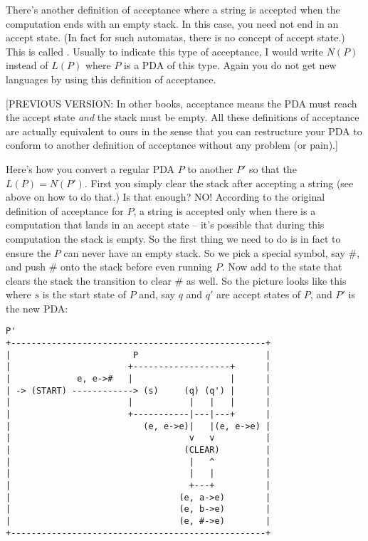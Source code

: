 There's another definition of acceptance where a string is accepted when the 
computation ends with an empty stack. 
In this case, you need not end in an accept state.
(In fact for such automatas, there is no concept of accept state.)
This is called .
Usually to indicate this type of acceptance, I would write $N(P)$
instead of $L(P)$ where $P$ is a PDA of this type.
Again you do not get new languages by using this definition of acceptance.


[PREVIOUS
VERSION: 
In other books, acceptance means the PDA must reach the accept state
\textit{ and} the stack must be empty.
All these definitions of acceptance are actually equivalent to ours
in the sense that you can restructure your PDA to conform to another definition
of acceptance without any problem (or pain).]


Here's how you convert a regular PDA $P$ to another $P'$ so that the 
$L(P) = N(P')$.
First you simply clear the stack after accepting a string (see above on how to
do that.)
Is that enough?
NO! According to the original definition of acceptance for $P$,
a string is accepted only when there is a computation that lands in an accept 
state -- it's possible that during this computation the stack is empty.
So the first thing we need to do is in fact to ensure the $P$ can never
have an empty stack.
So we pick a special symbol, say \#, and push \# onto the stack before even
running $P$. Now add to the state that clears the stack the transition
to clear \# as well.
So the picture looks like this where $s$ is the start state of $P$ and,
say $q$ and $q'$ are accept states of $P$, and $P'$ is the new PDA:

\begin{samepage}
\begin{verbatim}
P'
+--------------------------------------------------+
|                        P                         |
|                       +-------------------+      |
|             e, e->#   |                   |      |
| -> (START) ------------> (s)     (q) (q') |      |
|                       |           |   |   |      |
|                       +-----------|---|---+      |
|                          (e, e->e)|   |(e, e->e) |
|                                   v   v          |
|                                  (CLEAR)         |
|                                   |   ^          |
|                                   |   |          |
|                                   +---+          |
|                                 (e, a->e)        |
|                                 (e, b->e)        |
|                                 (e, #->e)        |
+--------------------------------------------------+
\end{verbatim}
\end{samepage}

